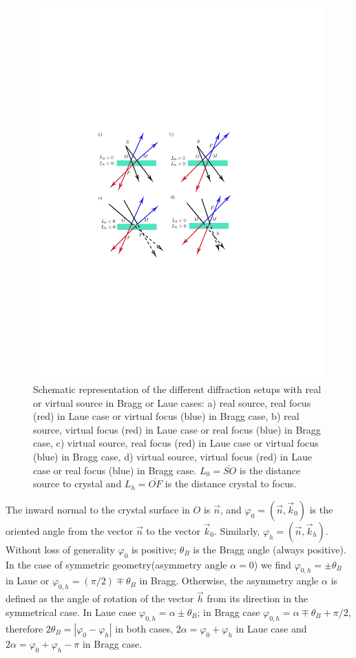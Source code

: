 \documentclass[preprint]{iucr}              %
\begin{document}
\begin{figure}
\label{fig:geometries}
\caption{Schematic representation of the different diffraction setups with real or virtual source in Bragg or Laue cases:
a) real source, real focus (red) in Laue case or virtual focus (blue) in Bragg case,
b) real source, virtual focus (red) in Laue case or real focus (blue) in Bragg case,
c) virtual source, real focus (red) in Laue case or virtual focus (blue) in Bragg case,  
d) virtual source, virtual focus (red) in Laue case or real focus (blue) in Bragg case.
$L_0=\overline{SO}$ is the distance source to crystal and $L_h=\overline{OF}$ is the distance crystal to focus.}

\includegraphics[width=0.99\textwidth,trim=4cm 9cm 6cm 9cm,clip=true]{fig1.pdf}
\end{figure}


The inward normal to the crystal surface in $O$ is $\vec n$, and $\varphi_0 = (\vec n, \vec k_0)$ is the oriented angle from the vector $\vec n$ to the vector $\vec k_0$. Similarly, $\varphi_h = (\vec n, \vec k_h)$. Without loss of generality $\varphi_0$ is positive; $\theta_B$ is the Bragg angle (always positive).
In the case of symmetric geometry(asymmetry angle $\alpha=0$) we find $\varphi_{0,h}=\pm\theta_B$ in Laue or $\varphi_{0,h}=(\pi/2)\mp\theta_B$ in Bragg. Otherwise, the asymmetry angle $\alpha$ is defined as the angle of rotation of the vector $\vec h$ from its direction in the symmetrical case. 
In Laue case $\varphi_{0,h}=\alpha \pm\theta_B$; in Bragg case $\varphi_{0,h}=\alpha\mp\theta_B+\pi/2$, therefore $2\theta_B=|\varphi_0-\varphi_h|$ in both cases, $2\alpha=\varphi_0+\varphi_h$ in Laue case and $2\alpha=\varphi_0+\varphi_h-\pi$ in Bragg case.
\end{document}
